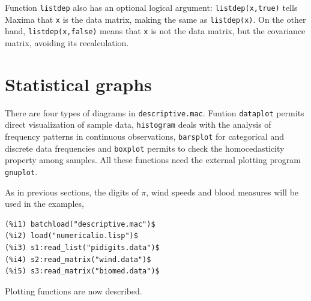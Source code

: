 \documentclass[12pt,a4paper]{article}
\begin{document}
\begin{description}
Function \verb|listdep| also has an optional logical argument: \verb|listdep(x,true)| tells Maxima that \verb|x| is the data matrix, making the same as \verb|listdep(x)|. On the other hand, \verb|listdep(x,false)| means that \verb|x| is not the data matrix, but the covariance matrix, avoiding its recalculation.


\end{description}



\section{Statistical graphs}

There are four types of diagrams in \verb|descriptive.mac|. Funtion \verb|dataplot| permits direct visualization of sample data, \verb|histogram| deals with the analysis of frequency patterns in continuous observations, \verb|barsplot| for categorical and discrete data frequencies and \verb|boxplot| permits to check the homocedasticity property among samples. All these functions need the external plotting program \verb|gnuplot|.

As in previous sections, the digits of $\pi$, wind speeds and blood measures will be used in the examples,
\begin{verbatim}
(%i1) batchload("descriptive.mac")$
(%i2) load("numericalio.lisp")$
(%i3) s1:read_list("pidigits.data")$
(%i4) s2:read_matrix("wind.data")$
(%i5) s3:read_matrix("biomed.data")$
\end{verbatim}

Plotting functions are now described.
\end{document}
